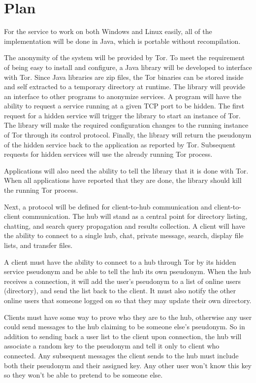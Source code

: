 \documentclass{article}
\begin{document}
\section{Plan}
For the service to work on both Windows and Linux easily, all of the implementation will be done in Java, which is portable without recompilation.

The anonymity of the system will be provided by Tor.  To meet the requirement of being easy to install and configure, a Java library will be developed to interface with Tor.  Since Java libraries are zip files, the Tor binaries can be stored inside and self extracted to a temporary directory at runtime.  The library will provide an interface to other programs to anonymize services.  A program will have the ability to request a service running at a given TCP port to be hidden.  The first request for a hidden service will trigger the library to start an instance of Tor.  The library will make the required configuration changes to the running instance of Tor through its control protocol.  Finally, the library will return the pseudonym of the hidden service back to the application as reported by Tor.  Subsequent requests for hidden services will use the already running Tor process.

Applications will also need the ability to tell the library that it is done with Tor.  When all applications have reported that they are done, the library should kill the running Tor process.

Next, a protocol will be defined for client-to-hub communication and client-to-client communication.  The hub will stand as a central point for directory listing, chatting, and search query propagation and results collection.  A client will have the ability to connect to a single hub, chat, private message, search, display file lists, and transfer files.

A client must have the ability to connect to a hub through Tor by its hidden service pseudonym and be able to tell the hub its own pseudonym.  When the hub receives a connection, it will add the user's pseudonym to a list of online users (directory), and send the list back to the client.  It must also notify the other online users that someone logged on so that they may update their own directory.

Clients must have some way to prove who they are to the hub, otherwise any user could send messages to the hub claiming to be someone else's pseudonym.  So in addition to sending back a user list to the client upon connection, the hub will associate a random key to the pseudonym and tell it only to client who connected.  Any subsequent messages the client sends to the hub must include both their pseudonym and their assigned key.  Any other user won't know this key so they won't be able to pretend to be someone else.
\end{document}
